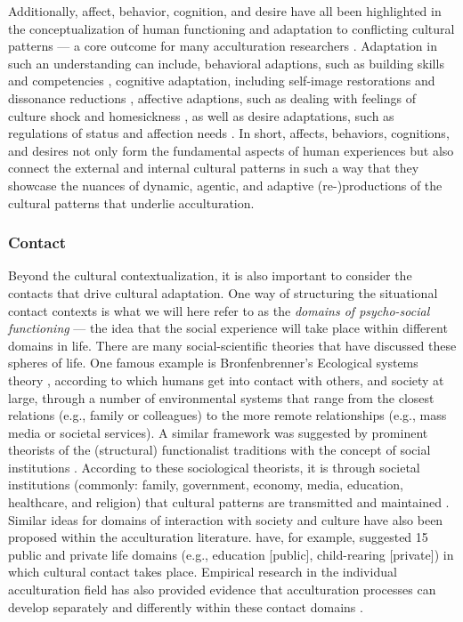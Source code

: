 \documentclass[man, 12pt, a4paper, mask]{apa7}
\begin{document}
Additionally, affect, behavior, cognition, and desire have all been highlighted in the conceptualization of human functioning and adaptation to conflicting cultural patterns --- a core outcome for many acculturation researchers \citep[e.g., see][]{Berry2006a, Searle1990, Ward2001, Maertz2016}. Adaptation in such an understanding can include, behavioral adaptions, such as building skills and competencies \citep[e.g.,][]{Bevan1965}, cognitive adaptation, including self-image restorations and dissonance reductions \citep[e.g.,][]{Czajkowska2017}, affective adaptions, such as dealing with feelings of culture shock and homesickness \citep[e.g.,][]{Smith1990, VanTilburg1996}, as well as desire adaptations, such as regulations of status and affection needs \citep[e.g.,][]{Steverink2006}. In short, affects, behaviors, cognitions, and desires not only form the fundamental aspects of human experiences but also connect the external and internal cultural patterns in such a way that they showcase the nuances of dynamic, agentic, and adaptive (re-)productions of the cultural patterns that underlie acculturation.

\subsubsection{Contact}
Beyond the cultural contextualization, it is also important to consider the contacts that drive cultural adaptation. One way of structuring the situational contact contexts is what we will here refer to as the \textit{domains of psycho-social functioning} --- the idea that the social experience will take place within different domains in life. There are many social-scientific theories that have discussed these spheres of life. One famous example is Bronfenbrenner's Ecological systems theory \citep{Bronfenbrenner1992}, according to which humans get into contact with others, and society at large, through a number of environmental systems that range from the closest relations (e.g., family or colleagues) to the more remote relationships (e.g., mass media or societal services). A similar framework was suggested by prominent theorists of the (structural) functionalist traditions with the concept of social institutions \citep[e.g.,][]{Turner1997}. According to these sociological theorists, it is through societal institutions (commonly: family, government, economy, media, education, healthcare, and religion) that cultural patterns are transmitted and maintained \citep[e.g.,][]{Durkheim1982}. Similar ideas for domains of interaction with society and culture have also been proposed within the acculturation literature. \citet{Arends-Toth2006, Arends-Toth2007} have, for example, suggested 15 public and private life domains (e.g., education [public], child-rearing [private]) in which cultural contact takes place. Empirical research in the individual acculturation field has also provided evidence that acculturation processes can develop separately and differently within these contact domains \citep[e.g.,][]{Arends-Toth2003a}. 
\end{document}
